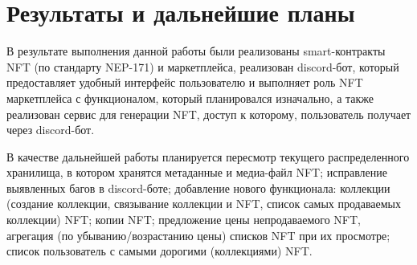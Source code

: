 \section{Результаты и дальнейшие планы}
\label{section.output}
В результате выполнения данной работы были реализованы smart-контракты NFT (по стандарту NEP-171) и маркетплейса, реализован discord-бот, который предоставляет удобный интерфейс пользователю и выполняет роль NFT маркетплейса с функционалом, который планировался изначально, а также реализован сервис для генерации NFT, доступ к которому, пользователь получает через discord-бот.

В качестве дальнейшей работы планируется пересмотр текущего распределенного хранилища, в котором хранятся метаданные и медиа-файл NFT; исправление выявленных багов в discord-боте; добавление нового функционала: коллекции (создание коллекции, связывание коллекции и NFT, список самых продаваемых коллекции) NFT; копии NFT; предложение цены непродаваемого NFT, агрегация (по убыванию/возрастанию цены) списков NFT при их просмотре; список пользователь с самыми дорогими (коллекциями) NFT.

\newpage
